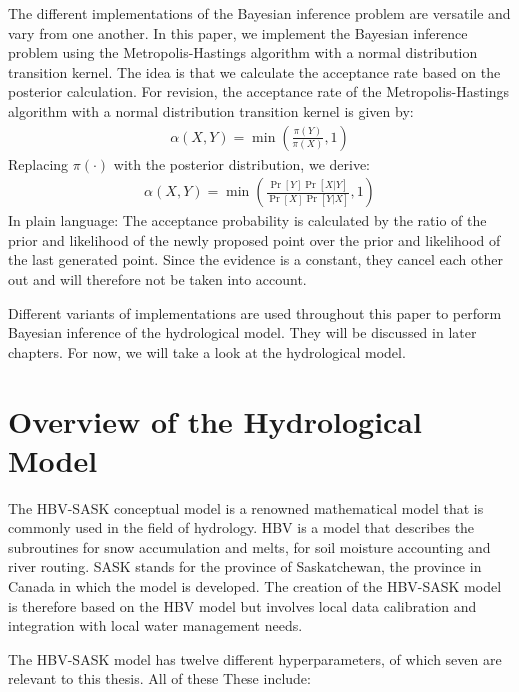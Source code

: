 The different implementations of the Bayesian inference problem are versatile and vary from one another. In this paper, we implement the Bayesian inference problem using the Metropolis-Hastings algorithm with a normal distribution transition kernel. The idea is that we calculate the acceptance rate based on the posterior calculation. For revision, the acceptance rate of the Metropolis-Hastings algorithm with a normal distribution transition kernel is given by:
\begin{align}
    \alpha(X, Y) = \min (\frac{\pi(Y)}{\pi(X)}, 1)
\end{align}
Replacing $\pi(\cdot)$ with the posterior distribution, we derive:
\begin{align}
    \alpha(X, Y) = \min (\frac{\Pr[Y]\Pr[X|Y]}{\Pr[X]\Pr[Y|X]}, 1)
\end{align}
In plain language: The acceptance probability is calculated by the ratio of the prior and likelihood of the newly proposed point over the prior and likelihood of the last generated point. Since the evidence is a constant, they cancel each other out and will therefore not be taken into account.

Different variants of implementations are used throughout this paper to perform Bayesian inference of the hydrological model. They will be discussed in later chapters. For now, we will take a look at the hydrological model.

\section{Overview of the Hydrological Model}
The HBV-SASK conceptual model is a renowned mathematical model that is commonly used in the field of hydrology. HBV is a model that describes the subroutines for snow accumulation and melts, for soil moisture accounting and river routing.\cite{hbv} SASK stands for the province of Saskatchewan, the province in Canada in which the model is developed. The creation of the HBV-SASK model is therefore based on the HBV model but involves local data calibration and integration with local water management needs.\cite{sask}

The HBV-SASK model has twelve different hyperparameters, of which seven are relevant to this thesis. All of these These include:\cite{hydrology}

